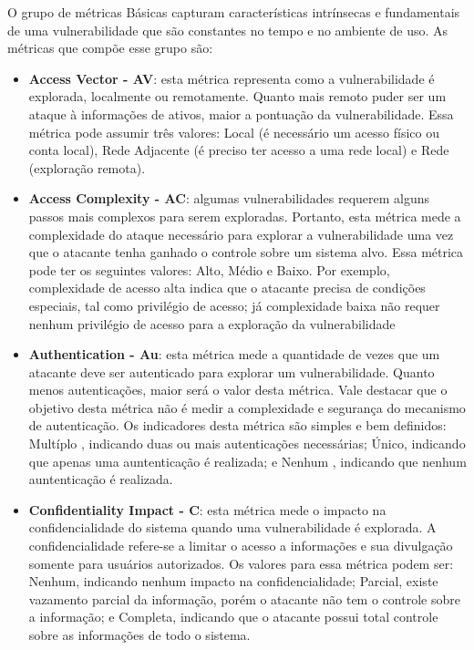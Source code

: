 %

O grupo de métricas Básicas capturam características intrínsecas e fundamentais de uma vulnerabilidade que são constantes no tempo e no ambiente de uso. As métricas que compõe esse grupo são:

\begin{itemize}
\item \textbf{Access Vector - AV}: esta métrica representa como a vulnerabilidade é explorada, localmente ou remotamente. Quanto mais remoto puder ser um ataque à informações de ativos, maior a pontuação da vulnerabilidade. Essa métrica pode assumir três valores: Local  (é necessário um acesso físico ou conta local), Rede Adjacente (é preciso ter acesso a uma rede local) e Rede (exploração remota).

\item \textbf{Access Complexity - AC}: algumas vulnerabilidades requerem alguns passos mais complexos para serem exploradas. Portanto, esta métrica mede a complexidade do ataque necessário para explorar a vulnerabilidade uma vez que o atacante tenha ganhado o controle sobre um sistema alvo. Essa métrica pode ter os seguintes valores: Alto, Médio e Baixo. Por exemplo, complexidade de acesso alta  indica que o atacante precisa de condições especiais, tal como privilégio de acesso; já complexidade baixa não requer nenhum privilégio de acesso para a exploração da vulnerabilidade
	
\item \textbf{Authentication - Au}: esta métrica mede a quantidade de vezes que um atacante deve ser autenticado para explorar um vulnerabilidade. Quanto menos autenticações, maior será o valor desta métrica. Vale destacar que o objetivo desta métrica não é medir a complexidade e segurança do mecanismo de autenticação. Os indicadores desta métrica são simples e bem definidos: Multíplo , indicando duas ou mais autenticações necessárias; Único, indicando que apenas uma auntenticação é realizada; e Nenhum , indicando que nenhum auntenticação é realizada.
\item \textbf{Confidentiality Impact - C}: esta métrica mede o impacto na confidencialidade do sistema quando uma vulnerabilidade é explorada. A confidencialidade refere-se a limitar o acesso a informações e sua divulgação somente para usuários autorizados. Os valores para essa métrica podem ser: Nenhum, indicando nenhum impacto na confidencialidade; Parcial, existe vazamento parcial da informação, porém o atacante não tem o controle sobre a informação; e Completa, indicando que o atacante possui total controle sobre as informações de todo o sistema.



\end{itemize}
